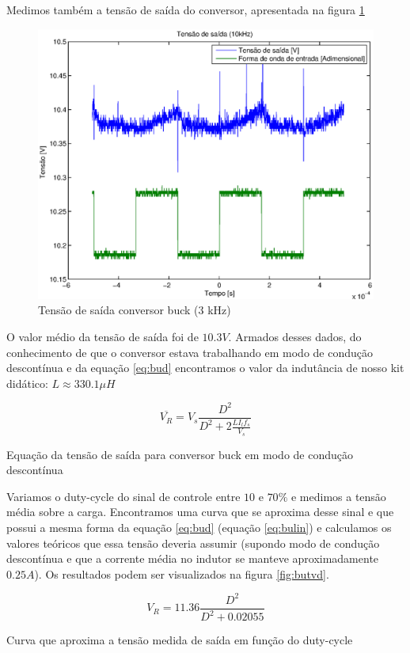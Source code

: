 \documentclass{article}
\begin{document}
Medimos também a tensão de saída do conversor, apresentada na figura \ref{fig:but3k}
\begin{figure}[H]
	\centering
	\includegraphics[width=0.5\linewidth]{Dados/buck/t3k}
	\caption{Tensão de saída conversor buck (3 kHz)}
	\label{fig:but3k}
\end{figure}

O valor médio da tensão de saída foi de $10.3 V$. Armados desses dados, do conhecimento de que o conversor estava trabalhando em modo de condução descontínua e da equação \ref{eq:bud} encontramos o valor da indutância de nosso kit didático: $L \approx 330.1 \mu H$

\begin{capequ}[H]
	\begin{equation}
	\overline{V_R} = V_s\frac{D^2}{D^2 + 2\frac{LI_lf_s}{V_s}}
	\end{equation}
	\caption{Equação da tensão de saída para conversor buck em modo de condução descontínua}
	\label{eq:bud}
\end{capequ}

Variamos o duty-cycle do sinal de controle entre $10$ e $70\%$ e medimos a tensão média sobre a carga. Encontramos uma curva que se aproxima desse sinal e que possui a mesma forma da equação \ref{eq:bud} (equação \ref{eq:bulin}) e calculamos os valores teóricos que essa tensão deveria assumir (supondo modo de condução descontínua e que a corrente média no indutor se manteve aproximadamente $0.25 A$). Os resultados podem ser visualizados na figura \ref{fig:butvd}.

\begin{capequ}[H]
	\begin{equation}
	V_R = 11.36\frac{D^2}{D^2 +  0.02055}	
	\end{equation}
	\caption{Curva que aproxima a tensão medida de saída em função do duty-cycle}
	\label{eq:bulin}
\end{capequ}
\end{document}
